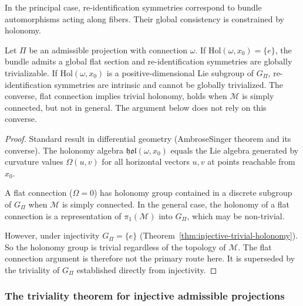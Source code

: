     In the principal case, re-identification symmetries correspond to bundle automorphisms acting along fibers.
    Their global consistency is constrained by holonomy.

    \begin{proposition}
      \label{prop:holonomy-gauge}
      Let $\Pi$ be an admissible projection with connection $\omega$.
      If $\mathrm{Hol}(\omega, x_0) = \{e\}$, the bundle admits a global flat section and
      re-identification symmetries are globally trivializable.
      If $\mathrm{Hol}(\omega, x_0)$ is a positive-dimensional Lie subgroup of $G_\Pi$,
      re-identification symmetries are intrinsic and cannot be globally trivialized.
      The converse, flat connection implies trivial holonomy, holds when $\mathcal{M}$ is simply connected,
      but not in general.
      The argument below does not rely on this converse.
    \end{proposition}

    \begin{proof}
      Standard result in differential geometry (Ambrose\textendash Singer theorem and its converse).
      The holonomy algebra $\mathfrak{hol}(\omega, x_0)$ equals the Lie algebra generated by
      curvature values $\Omega(u,v)$ for all horizontal vectors $u, v$ at points reachable
      from $x_0$.

      A flat connection ($\Omega = 0$) has holonomy group contained in a discrete subgroup of $G_\Pi$
      when $\mathcal{M}$ is simply connected.
      In the general case, the holonomy of a flat connection is a representation of
      $\pi_1(\mathcal{M})$ into $G_\Pi$, which may be non-trivial.

      However, under injectivity $G_\Pi = \{e\}$ (Theorem~\ref{thm:injective-trivial-holonomy}).
      So the holonomy group is trivial regardless of the topology of $\mathcal{M}$.
      The flat connection argument is therefore not the primary route here.
      It is superseded by the triviality of $G_\Pi$ established directly from injectivity.
    \end{proof}

  \subsubsection*{The triviality theorem for injective admissible projections}
    \label{subsec:stepA-triviality}

